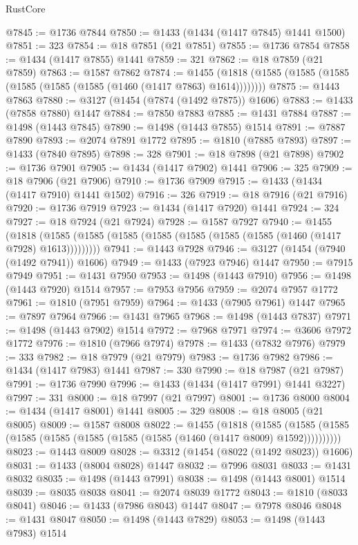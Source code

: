 \begin{lexlean}{RustCore}
\begin{coremodule}
@7845 := @1736 @7844
@7850 := @1433 (@1434 (@1417 @7845) @1441 @1500)
@7851 := 323
@7854 := @18 @7851 (@21 @7851)
@7855 := @1736 @7854
@7858 := @1434 (@1417 @7855) @1441
@7859 := 321
@7862 := @18 @7859 (@21 @7859)
@7863 := @1587 @7862
@7874 := @1455 (@1818 (@1585 (@1585 (@1585 (@1585 (@1585 (@1585 (@1460 (@1417 @7863) @1614))))))))
@7875 := @1443 @7863
@7880 := @3127 (@1454 (@7874 (@1492 @7875)) @1606)
@7883 := @1433 (@7858 @7880) @1447
@7884 := @7850 @7883
@7885 := @1431 @7884
@7887 := @1498 (@1443 @7845)
@7890 := @1498 (@1443 @7855) @1514
@7891 := @7887 @7890
@7893 := @2074 @7891 @1772
@7895 := @1810 (@7885 @7893)
@7897 := @1433 (@7840 @7895)
@7898 := 328
@7901 := @18 @7898 (@21 @7898)
@7902 := @1736 @7901
@7905 := @1434 (@1417 @7902) @1441
@7906 := 325
@7909 := @18 @7906 (@21 @7906)
@7910 := @1736 @7909
@7915 := @1433 (@1434 (@1417 @7910) @1441 @1502)
@7916 := 326
@7919 := @18 @7916 (@21 @7916)
@7920 := @1736 @7919
@7923 := @1434 (@1417 @7920) @1441
@7924 := 324
@7927 := @18 @7924 (@21 @7924)
@7928 := @1587 @7927
@7940 := @1455
    (@1818 (@1585 (@1585 (@1585 (@1585 (@1585 (@1585 (@1585 (@1460 (@1417 @7928) @1613)))))))))
@7941 := @1443 @7928
@7946 := @3127 (@1454 (@7940 (@1492 @7941)) @1606)
@7949 := @1433 (@7923 @7946) @1447
@7950 := @7915 @7949
@7951 := @1431 @7950
@7953 := @1498 (@1443 @7910)
@7956 := @1498 (@1443 @7920) @1514
@7957 := @7953 @7956
@7959 := @2074 @7957 @1772
@7961 := @1810 (@7951 @7959)
@7964 := @1433 (@7905 @7961) @1447
@7965 := @7897 @7964
@7966 := @1431 @7965
@7968 := @1498 (@1443 @7837)
@7971 := @1498 (@1443 @7902) @1514
@7972 := @7968 @7971
@7974 := @3606 @7972 @1772
@7976 := @1810 (@7966 @7974)
@7978 := @1433 (@7832 @7976)
@7979 := 333
@7982 := @18 @7979 (@21 @7979)
@7983 := @1736 @7982
@7986 := @1434 (@1417 @7983) @1441
@7987 := 330
@7990 := @18 @7987 (@21 @7987)
@7991 := @1736 @7990
@7996 := @1433 (@1434 (@1417 @7991) @1441 @3227)
@7997 := 331
@8000 := @18 @7997 (@21 @7997)
@8001 := @1736 @8000
@8004 := @1434 (@1417 @8001) @1441
@8005 := 329
@8008 := @18 @8005 (@21 @8005)
@8009 := @1587 @8008
@8022 := @1455
    (@1818
      (@1585 (@1585 (@1585 (@1585 (@1585 (@1585 (@1585 (@1585 (@1460 (@1417 @8009) @1592))))))))))
@8023 := @1443 @8009
@8028 := @3312 (@1454 (@8022 (@1492 @8023)) @1606)
@8031 := @1433 (@8004 @8028) @1447
@8032 := @7996 @8031
@8033 := @1431 @8032
@8035 := @1498 (@1443 @7991)
@8038 := @1498 (@1443 @8001) @1514
@8039 := @8035 @8038
@8041 := @2074 @8039 @1772
@8043 := @1810 (@8033 @8041)
@8046 := @1433 (@7986 @8043) @1447
@8047 := @7978 @8046
@8048 := @1431 @8047
@8050 := @1498 (@1443 @7829)
@8053 := @1498 (@1443 @7983) @1514

\end{coremodule}
\end{lexlean}
